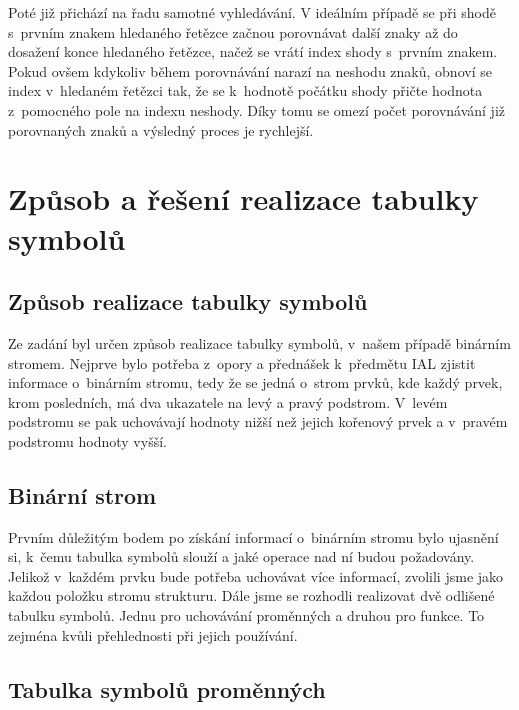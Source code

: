 \documentclass[12pt,a4paper,titlepage,final]{article}
\begin{document}
    Poté již přichází na řadu samotné vyhledávání. V ideálním případě se při
    shodě s~prvním znakem hledaného řetězce začnou porovnávat další znaky až
    do dosažení konce hledaného řetězce, načež se vrátí index shody s~prvním
    znakem. Pokud ovšem kdykoliv během porovnávání narazí na neshodu znaků,
    obnoví se index v~hledaném řetězci tak, že se k~hodnotě počátku shody
    přičte hodnota z~pomocného pole na indexu neshody. Díky tomu se omezí
    počet porovnávání již porovnaných znaků a výsledný proces je rychlejší.

  \section{Způsob a řešení realizace tabulky symbolů} \label{tabulka-symbolu}

    \subsection{Způsob realizace tabulky symbolů}

    Ze zadání byl určen způsob realizace tabulky symbolů, v~našem případě
    binárním stromem. Nejprve bylo potřeba z~opory a přednášek k~předmětu IAL
    zjistit informace o~binárním stromu, tedy že se jedná o~strom prvků, kde
    každý prvek, krom posledních, má dva ukazatele na levý a pravý podstrom.
    V~levém podstromu se pak uchovávají hodnoty nižší než jejich kořenový
    prvek a v~pravém podstromu hodnoty vyšší.

    \subsection{Binární strom}

    Prvním důležitým bodem po získání informací o~binárním stromu bylo
    ujasnění si, k~čemu tabulka symbolů slouží a jaké operace nad ní budou
    požadovány. Jelikož v~každém prvku bude potřeba uchovávat více informací,
    zvolili jsme jako každou položku stromu strukturu. Dále jsme se rozhodli
    realizovat dvě odlišené tabulku symbolů. Jednu pro uchovávání proměnných
    a druhou pro funkce. To zejména kvůli přehlednosti při jejich používání.

    \subsection{Tabulka symbolů proměnných}
\end{document}
